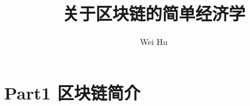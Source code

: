 \documentclass{article}
\begin{document}
\title{关于区块链的简单经济学}
\author{Wei Hu}
\maketitle

\section*{Part1 区块链简介}
\end{document}
